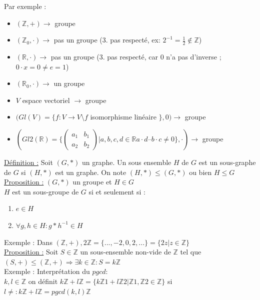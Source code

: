 \documentclass[11pt]{article}
\begin{document}
			Par exemple :
			\begin{itemize}
				\item $(\mathbb Z, +) \rightarrow$ groupe
				\item $(\mathbb Z_0, \cdot) \rightarrow$ pas un groupe (3. pas respecté, ex: $2^{-1} = \frac{1}{2} \not\in \mathbb Z$)
				\item $(\mathbb R, \cdot) \rightarrow$ pas un groupe (3.  pas respecté, car 0 n'a pas d'inverse ; $0 \cdot x = 0 \neq e = 1$)
				\item $(\mathbb R_0, \cdot) \rightarrow$ un groupe
				\item $V$ espace vectoriel $\rightarrow$ groupe
				\item $(Gl(V) = \{f : V \rightarrow V \setminus f$ isomorphisme linéaire $\}, 0) \rightarrow$ groupe
				\item $(Gl2(\mathbb R) = \{
					\begin{pmatrix}
  						a_1 & b_1 \\
						a_2 & b_2 
					\end{pmatrix} 
					| a, b, c, d \in \mathbb R  a \cdot d – b \cdot c \neq 0\}, \cdot) \rightarrow$ groupe
			\end{itemize}
			
			
			\underline{Définition :} Soit $(G, *)$ un graphe. Un sous ensemble $H$ de $G$ est un sous-graphe de $G$ si $(H,*)$ est un graphe. On note $(H,*) \leq (G,*)$ ou bien $H \leq G$\\
			
			\underline{Proposition :} $(G, *)$ un groupe et $H \in G$ \\
$H$ est un sous-groupe de $G$ si et seulement si :
			\begin{enumerate}
				\item $e \in H$
				\item $\forall g,h \in H : g * h^{-1} \in H$
			\end{enumerate} 
			Exemple : Dans $(\mathbb Z, +), 2 \mathbb Z = \{ ..., -2, 0, 2, ... \} = \{2z | z \in \mathbb Z \}$\\
			
			\underline{Proposition :} Soit $S \in \mathbb Z$  un sous-ensemble non-vide de $\mathbb Z$  tel que $(S, +) \leq (\mathbb Z , +) \Rightarrow \exists k \in\mathbb Z  : S = k\mathbb Z$\\
			
			Exemple :  Interprétation du $pgcd$: \\
$k, l \in\mathbb Z$  on définit $k \mathbb Z  + l \mathbb Z  =\{ k \mathbb Z 1 + l \mathbb Z 2 | \mathbb Z 1, \mathbb Z 2 \in\mathbb Z \}$
si $l \neq : k \mathbb Z  + l \mathbb Z  = pgcd(k, l) \mathbb Z$
\end{document}
